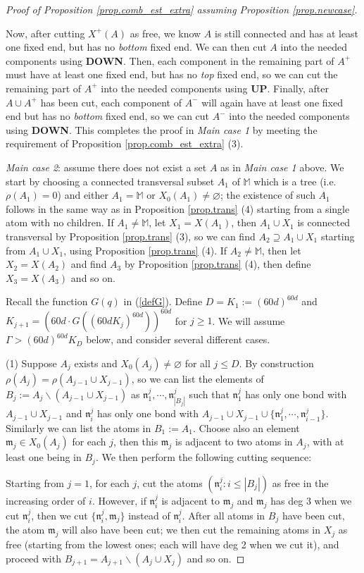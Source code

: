 \documentclass[10pt, reqno]{amsart}
\newcommand{\Mb}{\mathbb M}
\newcommand{\mf}{\mathfrak m}
\newcommand{\nf}{\mathfrak n}
\theoremstyle{definition}
\theoremstyle{remark}
\numberwithin{equation}{section}
\begin{document}
\begin{proof}[Proof of Proposition \ref{prop.comb_est_extra} assuming Proposition \ref{prop.newcase}]
\begin{itemize}
Now, after cutting $X^+(A)$ as free, we know $A$ is still connected and has at least one fixed end, but has no \emph{bottom} fixed end. We can then cut $A$ into the needed components using \textbf{DOWN}. Then, each component in the remaining part of $A^+$ must have at least one fixed end, but has no \emph{top} fixed end, so we can cut the remaining part of $A^+$ into the needed components using \textbf{UP}. Finally, after $A\cup A^+$ has been cut, each component of $A^-$ will again have at least one fixed end but has no \emph{bottom} fixed end, so we can cut $A^-$ into the needed components using \textbf{DOWN}. This completes the proof in \emph{Main case 1} by meeting the requirement of Proposition \ref{prop.comb_est_extra} (3).
\end{itemize}

\emph{Main case 2}: assume there does not exist a set $A$ as in \emph{Main case 1} above. We start by choosing a connected transversal subset $A_1$ of $\Mb$ which is a tree (i.e. $\rho(A_1)=0$) and either $A_1=\Mb$ or $X_0(A_1)\neq\varnothing$; the existence of such $A_1$ follows in the same way as in Proposition \ref{prop.trans} (4) starting from a single atom with no children. If $A_1\neq\Mb$, let $X_1=X(A_1)$, then $A_1\cup X_1$ is connected transversal by Proposition \ref{prop.trans} (3), so we can find $A_2\supseteq A_1\cup X_1$ starting from $A_1\cup X_1$, using Proposition \ref{prop.trans} (4). If $A_2\neq \Mb$, then let $X_2=X(A_2)$ and find $A_3$ by Proposition \ref{prop.trans} (4), then define $X_3=X(A_3)$ and so on.

Recall the function $G(q)$ in (\ref{defG}). Define $D=K_1:=(60d)^{60d}$ and $K_{j+1}=(60d\cdot G((60dK_{j})^{60d}))^{60d}$ for $j\geq 1$. We will assume $\Gamma>(60d)^{60d} K_D$ below, and consider several different cases.

(1) Suppose $A_j$ exists and $X_0(A_j)\neq\varnothing$ for all $j\leq D$. By construction $\rho(A_j)=\rho(A_{j-1}\cup X_{j-1})$, so we can list the elements of $B_j:=A_j\backslash (A_{j-1}\cup X_{j-1})$ as $\nf_1^j,\cdots ,\nf_{|B_j|}^j$ such that $\nf_1^j$ has only one bond with $A_{j-1}\cup X_{j-1}$ and $\nf_i^j$ has only one bond with $A_{j-1}\cup X_{j-1}\cup\{\nf_1^j,\cdots,\nf_{i-1}^j\}$. Similarly we can list the atoms in $B_1:=A_1$. Choose also an element $\mf_j\in X_0(A_j)$ for each $j$, then this $\mf_j$ is adjacent to two atoms in $A_j$, with at least one being in $B_j$. We then perform the following cutting sequence:

Starting from $j=1$, for each $j$, cut the atoms $(\nf_i^j:i\leq |B_j|)$ as free in the increasing order of $i$. However, if $\nf_i^j$ is adjacent to $\mf_{j}$ and $\mf_{j}$ has deg 3 when we cut $\nf_i^j$, then we cut $\{\nf_i^j,\mf_{j}\}$ instead of $\nf_i^j$. After all atoms in $B_j$ have been cut, the atom $\mf_{j}$ will also have been cut; we then cut the remaining atoms in $X_j$ as free (starting from the lowest ones; each will have deg 2 when we cut it), and proceed with $B_{j+1}=A_{j+1}\backslash (A_j\cup X_j)$ and so on.


\end{proof}
\end{document}
